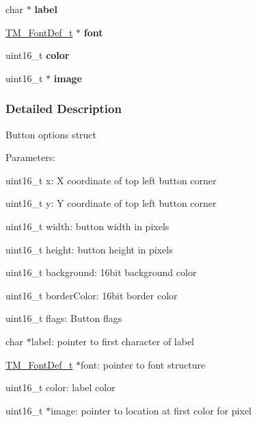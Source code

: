 \begin{DoxyCompactItemize}
\item 
\hypertarget{struct_t_m___i_l_i9341___button__t_acf60de4c64d60c1b9449c056bc6bfcf7}{}char $\ast$ {\bfseries label}\label{struct_t_m___i_l_i9341___button__t_acf60de4c64d60c1b9449c056bc6bfcf7}

\item 
\hypertarget{struct_t_m___i_l_i9341___button__t_ab00055e1e930a19f9dfe0f66f911340d}{}\hyperlink{struct_t_m___font_def__t}{T\+M\+\_\+\+Font\+Def\+\_\+t} $\ast$ {\bfseries font}\label{struct_t_m___i_l_i9341___button__t_ab00055e1e930a19f9dfe0f66f911340d}

\item 
\hypertarget{struct_t_m___i_l_i9341___button__t_a0b10c5b0fa8e65e009263b93ba2671ae}{}uint16\+\_\+t {\bfseries color}\label{struct_t_m___i_l_i9341___button__t_a0b10c5b0fa8e65e009263b93ba2671ae}

\item 
\hypertarget{struct_t_m___i_l_i9341___button__t_ad97de28d5864eed9b0d9c465557fcb88}{}uint16\+\_\+t $\ast$ {\bfseries image}\label{struct_t_m___i_l_i9341___button__t_ad97de28d5864eed9b0d9c465557fcb88}

\end{DoxyCompactItemize}


\subsubsection{Detailed Description}
Button options struct

Parameters\+:
\begin{DoxyItemize}
\item uint16\+\_\+t x\+: X coordinate of top left button corner
\item uint16\+\_\+t y\+: Y coordinate of top left button corner
\item uint16\+\_\+t width\+: button width in pixels
\item uint16\+\_\+t height\+: button height in pixels
\item uint16\+\_\+t background\+: 16bit background color
\item uint16\+\_\+t border\+Color\+: 16bit border color
\item uint16\+\_\+t flags\+: Button flags
\item char $\ast$label\+: pointer to first character of label
\item \hyperlink{struct_t_m___font_def__t}{T\+M\+\_\+\+Font\+Def\+\_\+t} $\ast$font\+: pointer to font structure
\item uint16\+\_\+t color\+: label color
\item uint16\+\_\+t $\ast$image\+: pointer to location at first color for pixel 
\end{DoxyItemize}